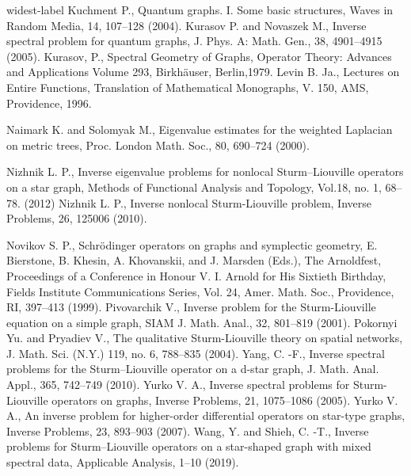 \documentclass[10pt,a4paper]{article}
\theoremstyle{plain}
\theoremstyle{definition}
\theoremstyle{remark}
\numberwithin{equation}{section}
\begin{document}
\begin{thebibliography}{widest-label}
Kuchment P., Quantum graphs. I. Some basic structures, Waves in Random Media, 14, 107--128 (2004).
Kurasov P. and Novaszek M., Inverse spectral problem for quantum graphs, J. Phys. A: Math. Gen., 38, 4901--4915 (2005).
Kurasov, P., Spectral Geometry of Graphs, Operator Theory: Advances and Applications
Volume 293, Birkh\"{a}user, Berlin,1979.
Levin B. Ja., Lectures on Entire Functions,
Translation of Mathematical Monographs, V. 150, AMS, Providence, 1996.

Naimark K. and Solomyak M., Eigenvalue estimates for the weighted Laplacian on metric trees, Proc. London Math. Soc., 80, 690--724  (2000).


Nizhnik L. P., Inverse eigenvalue problems for nonlocal Sturm--Liouville operators on a star graph, Methods of Functional Analysis and Topology,
Vol.18, no. 1, 68--78. (2012)
Nizhnik L. P., Inverse nonlocal Sturm-Liouville problem, Inverse Problems,  26, 125006 (2010). 


Novikov S. P., Schr\"{o}dinger operators on graphs and symplectic geometry, E. Bierstone, B. Khesin, A. Khovanskii, and J. Marsden (Eds.), The Arnoldfest, Proceedings of a Conference in Honour V. I. Arnold for His Sixtieth Birthday, Fields Institute Communications Series, Vol. 24, Amer. Math. Soc., Providence, RI, 397--413 (1999).
Pivovarchik V., Inverse problem for the Sturm-Liouville equation on a simple graph, SIAM J. Math. Anal., 32, 801--819 (2001).
Pokornyi Yu. and Pryadiev  V., The qualitative Sturm-Liouville theory on spatial networks, J. Math. Sci. (N.Y.) 119, no. 6, 788--835 (2004).
Yang, C. -F., Inverse spectral problems for the Sturm--Liouville operator on a d-star graph, J. Math. Anal. Appl., 365, 742--749  (2010).
Yurko V. A., Inverse spectral problems for Sturm-Liouville operators on graphs, Inverse Problems, 21, 1075--1086 (2005).
Yurko V. A., An inverse problem for higher-order differential operators on star-type graphs, Inverse Problems, 23, 893--903 (2007).
Wang, Y. and Shieh, C. -T., Inverse problems for Sturm--Liouville operators on a star-shaped graph with mixed spectral data, Applicable Analysis, 1--10 (2019).




\end{thebibliography}
\end{document}
